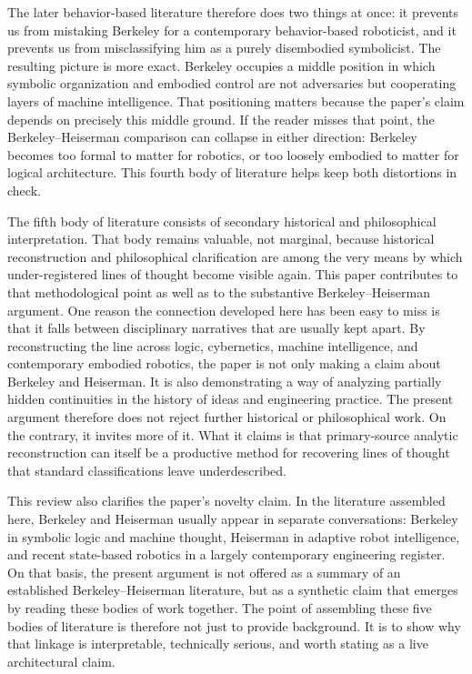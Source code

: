 \documentclass[11pt]{article}
\begin{document}
The later behavior-based literature therefore does two things at once: it prevents us from mistaking Berkeley for a contemporary behavior-based roboticist, and it prevents us from misclassifying him as a purely disembodied symbolicist. The resulting picture is more exact. Berkeley occupies a middle position in which symbolic organization and embodied control are not adversaries but cooperating layers of machine intelligence. That positioning matters because the paper's claim depends on precisely this middle ground. If the reader misses that point, the Berkeley--Heiserman comparison can collapse in either direction: Berkeley becomes too formal to matter for robotics, or too loosely embodied to matter for logical architecture. This fourth body of literature helps keep both distortions in check.

The fifth body of literature consists of secondary historical and philosophical interpretation. That body remains valuable, not marginal, because historical reconstruction and philosophical clarification are among the very means by which under-registered lines of thought become visible again. This paper contributes to that methodological point as well as to the substantive Berkeley--Heiserman argument. One reason the connection developed here has been easy to miss is that it falls between disciplinary narratives that are usually kept apart. By reconstructing the line across logic, cybernetics, machine intelligence, and contemporary embodied robotics, the paper is not only making a claim about Berkeley and Heiserman. It is also demonstrating a way of analyzing partially hidden continuities in the history of ideas and engineering practice. The present argument therefore does not reject further historical or philosophical work. On the contrary, it invites more of it. What it claims is that primary-source analytic reconstruction can itself be a productive method for recovering lines of thought that standard classifications leave underdescribed.

This review also clarifies the paper's novelty claim. In the literature assembled here, Berkeley and Heiserman usually appear in separate conversations: Berkeley in symbolic logic and machine thought, Heiserman in adaptive robot intelligence, and recent state-based robotics in a largely contemporary engineering register. On that basis, the present argument is not offered as a summary of an established Berkeley--Heiserman literature, but as a synthetic claim that emerges by reading these bodies of work together. The point of assembling these five bodies of literature is therefore not just to provide background. It is to show why that linkage is interpretable, technically serious, and worth stating as a live architectural claim.
\end{document}
